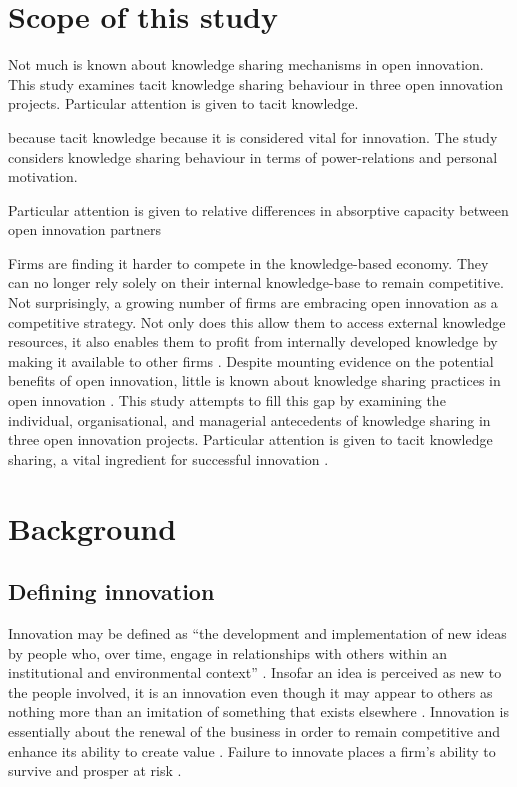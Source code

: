 
\section{Scope of this study}

Not much is known about knowledge sharing mechanisms in open innovation. This study examines tacit knowledge sharing behaviour in three open innovation projects. Particular attention is given to tacit knowledge. 


 because tacit knowledge  because it is considered vital for innovation. The study considers knowledge sharing behaviour in terms of power-relations and personal motivation. 



Particular attention is given to relative differences in absorptive capacity between open innovation partners 

Firms are finding it harder to compete in the knowledge-based economy. They can no longer rely solely on their internal knowledge-base to remain competitive. Not surprisingly, a growing number of firms are embracing open innovation as a competitive strategy. Not only does this allow them to access external knowledge resources, it also enables them to profit from internally developed knowledge by making it available to other firms \citep{laursen2006open,chesbrough2013managing,stanko2017under}. Despite mounting evidence on the potential benefits of open innovation, little is known about knowledge sharing practices in open innovation \citep{lakemond2016match}. This study attempts to fill this gap by examining the individual, organisational, and managerial antecedents of knowledge sharing in three open innovation projects. Particular attention is given to tacit knowledge sharing, a vital ingredient for successful innovation \citep{leonard1998role,koskinen2002role,cavusgil2003tacit,seidler2008use,leonard2014knowledge}.

\section{Background}

\subsection{Defining innovation}

Innovation may be defined as \enquote{the development and implementation of new ideas by people who, over time, engage in relationships with others within an institutional and environmental context} \citep[][pg.]{van1986central}. Insofar an idea is perceived as new to the people involved, it is an innovation even though it may appear to others as nothing more than an imitation of something that exists elsewhere \citep{van1986central}. Innovation is essentially about the renewal of the business in order to remain competitive and enhance its ability to create value \citep{schumpeter1950capitalism}. Failure to innovate places a firm's ability to survive and prosper at risk \citep{bessant2005managing}.

